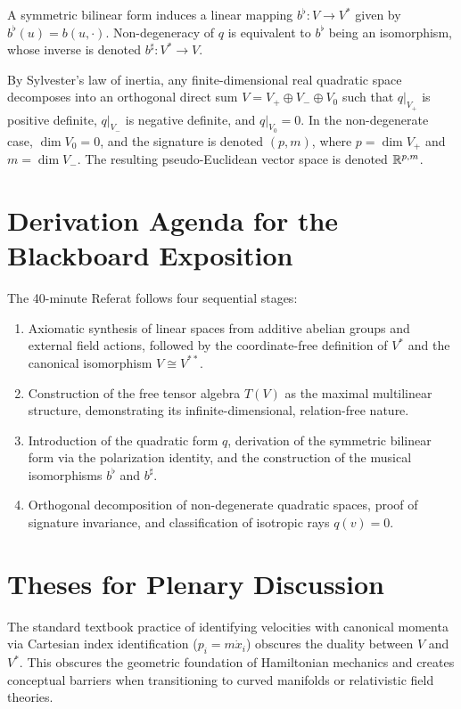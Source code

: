 \documentclass[11pt,a4paper]{article}
\begin{document}
A symmetric bilinear form induces a linear mapping $b^\flat : V \to V^*$ given
by $b^\flat(u) = b(u, \cdot)$.
Non-degeneracy of $q$ is equivalent to $b^\flat$ being an isomorphism, whose
inverse is denoted $b^\sharp : V^* \to V$.

By Sylvester's law of inertia, any finite-dimensional real quadratic space
decomposes into an orthogonal direct sum $V = V_+ \oplus V_- \oplus V_0$ such
that $q|_{V_+}$ is positive definite, $q|_{V_-}$ is negative definite, and
$q|_{V_0} = 0$.
In the non-degenerate case, $\dim V_0 = 0$, and the signature is denoted $(p,
m)$, where $p = \dim V_+$ and $m = \dim V_-$.
The resulting pseudo-Euclidean vector space is denoted $\mathbb{R}^{p,m}$.

\section{Derivation Agenda for the Blackboard Exposition}
\label{sec:agenda}

The 40-minute Referat follows four sequential stages:
\begin{enumerate}
  \item Axiomatic synthesis of linear spaces from additive abelian groups and
    external field actions, followed by the coordinate-free definition of $V^*$
    and the canonical isomorphism $V \cong V^{**}$.
  \item Construction of the free tensor algebra $T(V)$ as the maximal
    multilinear structure, demonstrating its infinite-dimensional, relation-free
    nature.
  \item Introduction of the quadratic form $q$, derivation of the symmetric
    bilinear form via the polarization identity, and the construction of the
    musical isomorphisms $b^\flat$ and $b^\sharp$.
  \item Orthogonal decomposition of non-degenerate quadratic spaces, proof of
    signature invariance, and classification of isotropic rays $q(v) = 0$.
\end{enumerate}

\section{Theses for Plenary Discussion}
\label{sec:theses}

\begin{thesis}
  The standard textbook practice of identifying velocities with canonical
  momenta via Cartesian index identification ($p_i = m \dot{x}_i$) obscures
  the duality between $V$ and $V^*$.
  This obscures the geometric foundation of Hamiltonian mechanics and creates
  conceptual barriers when transitioning to curved manifolds or relativistic
  field theories.
\end{thesis}
\end{document}
